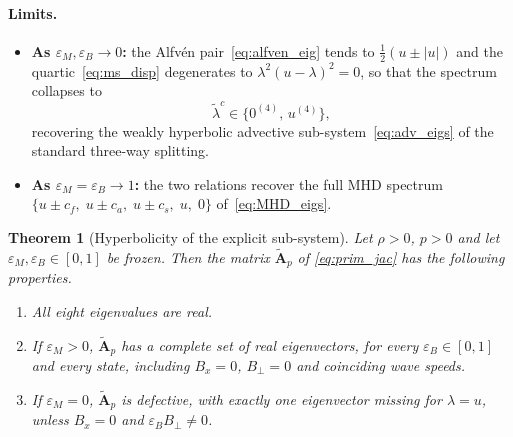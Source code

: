 \documentclass[a4paper,fleqn]{cas-sc}
\newtheorem{theorem}{Theorem}[section]
\theoremstyle{remark}
\newcommand{\eps}{\varepsilon}
\newcommand{\epsM}{\eps_{M}}
\newcommand{\epsB}{\eps_{B}}
\newcommand{\half}{\tfrac{1}{2}}
\begin{document}
\paragraph{Limits.}
\begin{itemize}
\item \textbf{As $\epsM,\epsB\to0$:} the Alfv\'en pair~\eqref{eq:alfven_eig}
tends to $\half(u\pm|u|)$ and the quartic~\eqref{eq:ms_disp} degenerates to
$\lambda^2(u-\lambda)^2=0$, so that the spectrum collapses to
\begin{equation}
\tilde\lambda^{c}\in\{0^{(4)},\,u^{(4)}\},
\end{equation}
recovering the weakly hyperbolic advective sub-system~\eqref{eq:adv_eigs} of the standard
three-way splitting.

\item \textbf{As $\epsM=\epsB\to1$:} the two relations recover the full MHD
spectrum $\{u\pm c_f,\;u\pm c_a,\;u\pm c_s,\;u,\;0\}$
of~\eqref{eq:MHD_eigs}.
\end{itemize}

\begin{theorem}[Hyperbolicity of the explicit sub-system]\label{thm:hyp}
Let $\rho>0$, $p>0$ and let $\varepsilon_M,\varepsilon_B\in[0,1]$ be frozen.
Then the matrix $\tilde{\mathbf A}_p$ of \eqref{eq:prim_jac} has the following properties.
\begin{enumerate}
\item[(i)] All eight eigenvalues are real.
\item[(ii)] If $\varepsilon_M>0$, $\tilde{\mathbf A}_p$ has a complete set of
real eigenvectors, for every $\varepsilon_B\in[0,1]$ and every state,
including $B_x=0$, $B_\perp=0$ and coinciding wave speeds.
\item[(iii)] If $\varepsilon_M=0$, $\tilde{\mathbf A}_p$ is defective, with
exactly one eigenvector missing for $\lambda=u$, unless $B_x=0$ and
$\varepsilon_BB_\perp\neq0$.
\end{enumerate}
\end{theorem}
 
\end{document}
